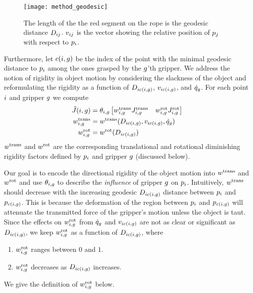 \begin{figure}[ht]
    \centering
    \texttt{[image: method\_geodesic]}
    \caption{The length of the the red segment on the rope is the geodesic distance $D_{i j}$. $v_{i j}$ is the vector showing the relative position of $p_j$ with respect to $p_i$.}
    \label{fig:distance_vec_defs}
\end{figure}

Furthermore, let $c(i, g)$ be the index of the point with the minimal geodesic distance to $p_i$ among the ones grasped by the $g$'th gripper. We address the notion of rigidity in object motion by considering the slackness of the object and reformulating the rigidity as a function of $D_{i c(i, g)}$, $v_{i c(i, g)}$, and $\dot{q}_g$. For each point $i$ and gripper $g$ we compute
\begin{equation}
\begin{split}
    \tilde {J}(i, g) 
                        &= \theta_{i, g} \begin{bmatrix} w^{\textrm{trans}}_{i, g} J^{\textrm{trans}}_{i, g} & w^{\textrm{rot}}_{i, g} J^{\textrm{rot}}_{i, g} \end{bmatrix} \\
    w^{\textrm{trans}}_{i, g}    &= w^{\textrm{trans}}(D_{i c(i, g)}, v_{i c(i, g)}, \dot{q}_g) \\
    w^{\textrm{rot}}_{i, g}      &= w^{\textrm{rot}}(D_{i c(i, g)}) \\
\end{split}
\label{eq:trans_rot_rigidity_diminishing_jacobian}
\end{equation}
$w^{\textrm{trans}}$ and $w^{\textrm{rot}}$ are the corresponding translational and rotational diminishing rigidity factors defined by $p_i$ and gripper $g$ (discussed below). 

Our goal is to encode the directional rigidity of the object motion into $w^{\textrm{trans}}$ and $w^{\textrm{rot}}$ and use $\theta_{i, g}$ to describe the \textit{influence} of gripper $g$ on $p_i$. Intuitively, $w^{\textrm{trans}}$ should decrease with the increasing geodesic $D_{i c(i, g)}$ distance between $p_i$ and $p_{c(i, g)}$. This is because the deformation of the region between $p_i$ and $p_{c(i, g)}$ will attenuate the transmitted force of the gripper's motion unless the object is taut. Since the effects on $w^{\textrm{rot}}_{i, g}$ from $\dot{q}_g$ and $v_{i c(i, g)}$ are not as clear or significant as $D_{i c(i, g)}$, we keep $w^{\textrm{rot}}_{i, g}$ as a function of $D_{i c(i, g)}$, where 
\begin{enumerate}
    \item $w^{\textrm{rot}}_{i, g}$ ranges between $0$ and $1$.
    \item $w^{\textrm{rot}}_{i, g}$ decreases as $D_{i c(i, g)}$ increases.
\end{enumerate}
We give the definition of $w^{\textrm{rot}}_{i, g}$ below.

